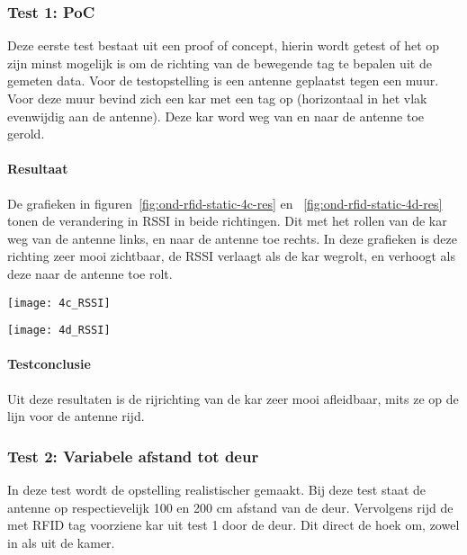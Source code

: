 \subsubsection{Test 1: PoC}
\label{sec:ond-rfid-3-1}
Deze eerste test bestaat uit een proof of concept, hierin wordt getest of het op zijn minst mogelijk is om de richting van de bewegende tag te bepalen uit de gemeten data. 
Voor de testopstelling is een antenne geplaatst tegen een muur. Voor deze muur bevind zich een kar met een tag op (horizontaal in het vlak evenwijdig aan de antenne). Deze kar word weg van en naar de antenne toe gerold.

\paragraph{Resultaat}
De grafieken in figuren~\ref{fig:ond-rfid-static-4c-res} en ~\ref{fig:ond-rfid-static-4d-res}  tonen de verandering in RSSI in beide richtingen. Dit met het rollen van de kar weg van de antenne links, en naar de antenne toe rechts. In deze grafieken is deze richting zeer mooi zichtbaar, de RSSI verlaagt als de kar wegrolt, en verhoogt als deze naar de antenne toe rolt.

\begin{minipage}{0.42\textwidth}
	\texttt{[image: 4c\_RSSI]}
	\label{fig:ond-rfid-static-4c-res}
\end{minipage}
\hfill
\begin{minipage}{0.42\textwidth}
	\texttt{[image: 4d\_RSSI]}
	\label{fig:ond-rfid-static-4d-res}
\end{minipage}

\paragraph{Testconclusie}
Uit deze resultaten is de rijrichting van de kar zeer mooi afleidbaar, mits ze op de lijn voor de antenne rijd.

\subsubsection{Test 2: Variabele afstand tot deur}
\label{sec:ond-rfid-3-2}
In deze test wordt de opstelling realistischer gemaakt. Bij deze test staat de antenne op respectievelijk 100 en 200 cm afstand van de deur. Vervolgens rijd de met RFID tag voorziene kar uit test 1 door de deur. Dit direct de hoek om, zowel in als uit de kamer.

